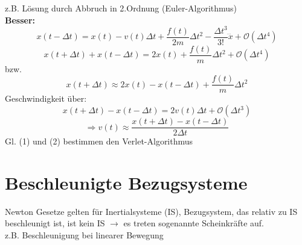 \documentclass[titlepage,12pt,a4paper,ngerman]{report}
\begin{document}
z.B. Lösung durch Abbruch in 2.Ordnung (Euler-Algorithmus)\\
\textbf{Besser:}
$$x(t-\Delta t) = x(t) -v(t) \Delta t + \frac{f(t)}{2m} \Delta t^2 - \frac{\Delta t^3}{3!} \dddot{x} + \mathcal{O}(\Delta t^4)$$
$$ x(t+\Delta t) + x(t-\Delta t) = 2x(t) + \frac{f(t)}{m} \Delta t^2 + \mathcal{O}(\Delta t^4)$$
bzw.
\begin{equation*}
x(t+\Delta t) \approx 2 x(t) - x(t-\Delta t) + \frac{f(t)}{m} \Delta t^2 \tag{1}
\end{equation*}
Geschwindigkeit über:
$$x(t+ \Delta t) - x(t - \Delta t) = 2 v(t) \Delta t + \mathcal{O}(\Delta t^3)$$
\begin{equation*}
\Rightarrow v(t) \approx \frac{x(t+\Delta t) - x(t- \Delta t)}{2 \Delta t} \tag{2}
\end{equation*}
Gl. (1) und (2) bestimmen den Verlet-Algorithmus
\section{Beschleunigte Bezugsysteme}
Newton Gesetze gelten für Inertialsysteme (IS), Bezugsystem, das relativ zu IS beschleunigt ist, ist kein IS $\rightarrow$ es treten sogenannte Scheinkräfte auf.\\
z.B. Beschleunigung bei linearer Bewegung
\end{document}
